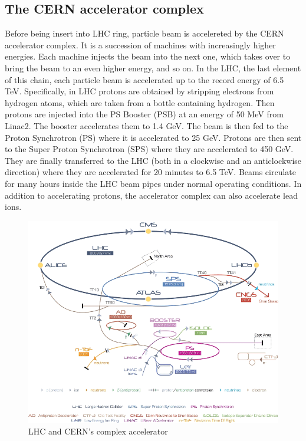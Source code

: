 \documentclass[a4paper, oneside]{book}
\begin{document}
				\subsection{The CERN accelerator complex}
					\cite{Acc. complex} Before being insert into LHC ring, particle beam is accelereted by the CERN accelerator complex. It is a succession of machines with increasingly higher energies. Each machine injects the beam into the next one, which takes over to bring the beam to an even higher energy, and so on. In  the  LHC, the  last  element  of  this  chain, each particle beam is accelerated up to the record energy of 6.5 TeV. Specifically, in LHC protons are obtained by stripping electrons from hydrogen atoms, which are taken from a bottle containing hydrogen. Then protons are injected into the PS Booster (PSB) at an  energy of 50 MeV from Linac2. The  booster  accelerates  them  to  1.4  GeV.  The  beam  is  then  fed  to  the  Proton  Synchrotron  (PS)  where  it  is  accelerated  to  25 GeV. Protons are then sent to the Super Proton Synchrotron (SPS) where they are accelerated to 450 GeV. They  are  finally  transferred  to  the  LHC  (both  in  a  clockwise  and an anticlockwise direction) where they are accelerated for 20 minutes to 6.5 TeV. Beams circulate for many hours inside the LHC beam pipes under normal operating conditions.
					In addition to accelerating protons, the accelerator complex can also accelerate lead ions. 
					\begin{figure}
						\centering
						\includegraphics[width=0.3\textheight]{tesi_images/CERN.png}
						\caption{LHC and CERN's complex accelerator}
						\label{fig:CERN structure}
					\end{figure}
\end{document}
